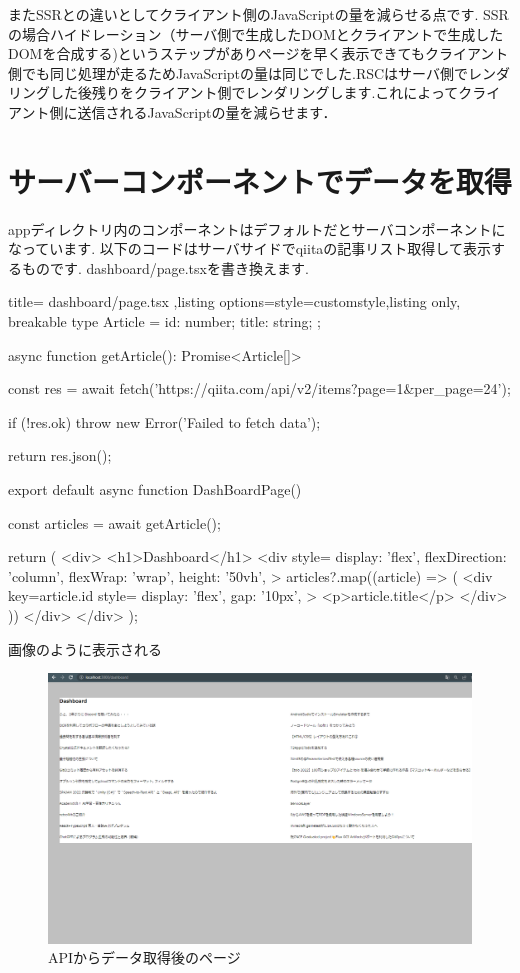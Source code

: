 またSSRとの違いとしてクライアント側のJavaScriptの量を減らせる点です.
SSRの場合ハイドレーション（サーバ側で生成したDOMとクライアントで生成したDOMを合成する)というステップがありページを早く表示できてもクライアント側でも同じ処理が走るためJavaScriptの量は同じでした.RSCはサーバ側でレンダリングした後残りをクライアント側でレンダリングします.これによってクライアント側に送信されるJavaScriptの量を減らせます．


\section{サーバーコンポーネントでデータを取得}


appディレクトリ内のコンポーネントはデフォルトだとサーバコンポーネントになっています.
以下のコードはサーバサイドでqiitaの記事リスト取得して表示するものです.
dashboard/page.tsxを書き換えます.



\begin{tcblisting}{title={
        dashboard/page.tsx
      },listing options={style=customstyle},listing only, breakable}
  type Article = {
  id: number;
  title: string;
  };

  async function getArticle(): Promise<Article[]> {
  const res = await fetch('https://qiita.com/api/v2/items?page=1&per_page=24');

  if (!res.ok) {
      throw new Error('Failed to fetch data');
    }

  return res.json();
  }

  export default async function DashBoardPage() {
  const articles = await getArticle();

  return (
  <div>
  <h1>Dashboard</h1>
  <div
  style={{
      display: 'flex',
      flexDirection: 'column',
      flexWrap: 'wrap',
      height: '50vh',
    }}
  >
  {articles?.map((article) => (
  <div
  key={article.id}
  style={{
      display: 'flex',
      gap: '10px',
    }}
  >
    <p>{article.title}</p>
  </div>
  ))}
  </div>
  </div>
  );
  }


\end{tcblisting}






画像のように表示される

\begin{figure}[H]
  \centering
  \includegraphics[width=12cm]{./image/03-Tech/chap4/06.png}
  \caption{APIからデータ取得後のページ}
\end{figure}


